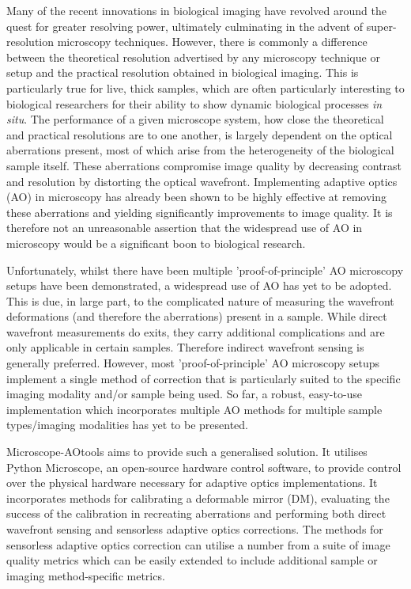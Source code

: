 Many of the recent innovations in biological imaging have revolved around the quest for greater resolving power, ultimately culminating in the advent of super-resolution microscopy techniques. However, there is commonly a difference between the theoretical resolution advertised by any microscopy technique or setup and the practical resolution obtained in biological imaging. This is particularly true for live, thick samples, which are often particularly interesting to biological researchers for their ability to show dynamic biological processes \textit{in situ}. The performance of a given microscope system, how close the theoretical and practical resolutions are to one another, is largely dependent on the optical aberrations present, most of which arise from the heterogeneity of the biological sample itself.\cite{schwertner2004characterizing,schwertner2004measurement} These aberrations compromise image quality by decreasing contrast and resolution by distorting the optical wavefront.\cite{booth2007adaptive,wyant1992basic} Implementing adaptive optics (AO) in microscopy has already been shown to be highly effective at removing these aberrations and yielding significantly improvements to image quality.\cite{booth2014adaptive,girkin2009adaptive} It is therefore not an unreasonable assertion that the widespread use of AO in microscopy would be a significant boon to biological research.

Unfortunately, whilst there have been multiple 'proof-of-principle' AO microscopy setups have been demonstrated, a widespread use of AO has yet to be adopted. This is due, in large part, to the complicated nature of measuring the wavefront deformations (and therefore the aberrations) present in a sample. While direct wavefront measurements do exits, they carry additional complications and are only applicable in certain samples.\cite{wang2014rapid,wang2015direct} Therefore indirect wavefront sensing is generally preferred.\cite{rodriguez2018adaptive} However, most 'proof-of-principle' AO microscopy setups implement a single method of correction that is particularly suited to the specific imaging modality and/or sample being used. So far, a robust, easy-to-use implementation which incorporates multiple AO methods for multiple sample types/imaging modalities has yet to be presented.\cite{ji2017adaptive}

Microscope-AOtools aims to provide such a generalised solution. It utilises Python Microscope, an open-source hardware control software, to provide control over the physical hardware necessary for adaptive optics implementations. It incorporates methods for calibrating a deformable mirror (DM), evaluating the success of the calibration in recreating aberrations and performing both direct wavefront sensing and sensorless adaptive optics corrections. The methods for sensorless adaptive optics correction can utilise a number from a suite of image quality metrics which can be easily extended to include additional sample or imaging method-specific metrics.

